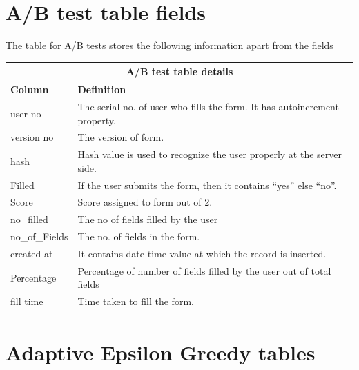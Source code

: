 \documentclass[12pt]{report}
\begin{document}
\section{A/B test table fields}
The table for A/B tests stores the following information apart from the fields
\newline

\begin{tabular}{ |p{3cm}|p{12cm}|  }
\hline
\multicolumn{2}{|c|}{\textbf {A/B test table details}} \\
\hline
\textbf { Column} & \textbf { Definition}  \\
\hline
user no & The serial no. of user who fills the form. It has autoincrement property.  \\
\hline
version no & The version of form.    \\
\hline
hash & Hash value is used to recognize the user properly at the server side.  \\
\hline
Filled  &  If the user submits the form, then it contains “yes” else “no”. \\
\hline
Score & Score assigned to form out of 2.  \\
\hline
no\_filled & The no of fields filled by the user \\
\hline
no\_of\_Fields & The no. of fields in the form.  \\
\hline
created at & It contains date time value at which the record is inserted.  \\
\hline
Percentage & Percentage of number of fields filled by the user out of total fields   \\
\hline
fill time & Time taken to fill the form.  \\
\hline
\end{tabular}
\newpage
\section{Adaptive Epsilon Greedy  tables}
\end{document}
